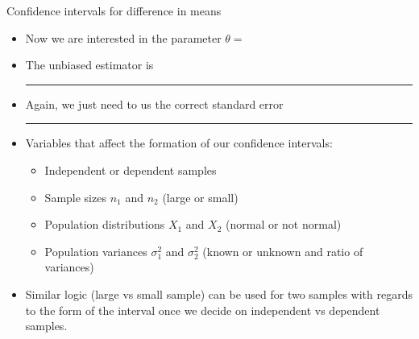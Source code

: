 \documentclass{article}
\newcommand{\blankul}[1]{\rule[-1.5mm]{#1}{0.15mm}}	%
\begin{document}
Confidence intervals for difference in means\bigskip
\begin{itemize}
    \item Now we are interested in the parameter $\theta = $
    \item[] The unbiased estimator is \blankul{2cm}
    \item[] Again, we just need to us the correct standard error \blankul{2cm}
    \item Variables that affect the formation of our confidence intervals:
    \begin{itemize}
        \item Independent or dependent samples
        \item Sample sizes $n_1$ and $n_2$ (large or small)
        \item Population distributions $X_1$ and $X_2$ (normal or not normal)
        \item Population variances $\sigma^2_1$ and $\sigma^2_2$ (known or unknown and ratio of variances)
    \end{itemize}
    \item Similar logic (large vs small sample) can be used for two samples with regards to the form of the interval once we decide on independent vs dependent samples.
\end{itemize}\bigskip
\end{document}

